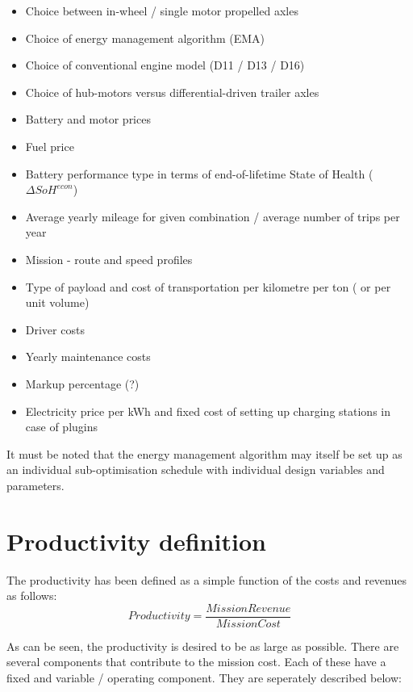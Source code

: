\documentclass[ExampleMasters.tex]{subfiles}
\begin{document}
		\begin{itemize}
		\item Choice between in-wheel / single motor propelled axles
		\item Choice of energy management algorithm (EMA)
		\item Choice of conventional engine model (D11 / D13 / D16)
		\item Choice of hub-motors versus differential-driven trailer axles
		\item Battery and motor prices
		\item Fuel price
		\item Battery performance type in terms of end-of-lifetime State of Health ($\Delta SoH^{econ}$)
		\item Average yearly mileage for given combination / average number of trips per year
		\item Mission - route and speed profiles
		\item Type of payload and cost of transportation per kilometre per ton ( or per unit volume)
		\item Driver costs
		\item Yearly maintenance costs
		\item Markup percentage (?)
		\item Electricity price per kWh and fixed cost of setting up charging stations in case of plugins
		\end{itemize}

		It must be noted that the energy management algorithm may itself be set up as an individual sub-optimisation schedule with individual design variables and parameters.

	\section{Productivity definition}

		The productivity has been defined as a simple function of the costs and revenues as follows:\\

		\begin{equation}
			Productivity = \frac{Mission Revenue}{Mission Cost}
		\end{equation}

		As can be seen, the productivity is desired to be as large as possible. There are several components that contribute to the mission cost. Each of these have a fixed and variable / operating component. They are seperately described below:\\
\end{document}
